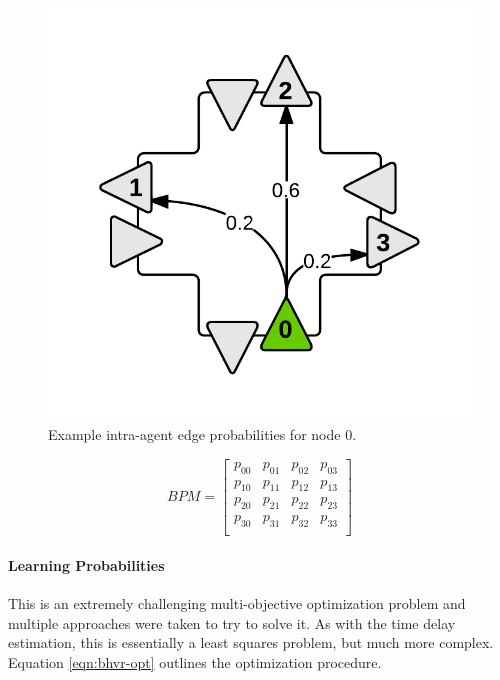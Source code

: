 \documentclass{report}
\begin{document}
\begin{figure}[H]
  \begin{centering}
    \includegraphics[scale=0.3]{figures/BPM-example.png}
    \caption{Example intra-agent edge probabilities for node 0.}
    \label{fig:BPM-example}
  \end{centering}
\end{figure}


\[
{BPM} =
    \begin{bmatrix}
    p_{00} & p_{01} & p_{02} & p_{03} \\
    p_{10} & p_{11} & p_{12} & p_{13} \\
p_{20} & p_{21} & p_{22} & p_{23} \\
p_{30} & p_{31} & p_{32} & p_{33} \\
    \end{bmatrix}
\]

\paragraph{Learning Probabilities}
This is an extremely challenging multi-objective optimization problem and multiple approaches were taken to try to solve it. 
As with the time delay estimation, this is essentially a least squares problem, but much more complex. Equation \eqref{eqn:bhvr-opt} outlines the optimization procedure.  \\
\end{document}

